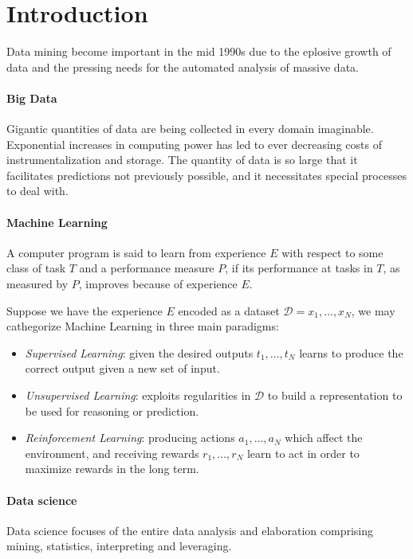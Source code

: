 \section{Introduction}

Data mining become important in the mid 1990s due to the eplosive growth of data and the pressing needs for the automated analysis of massive data. 

\paragraph*{Big Data}
Gigantic quantities of data are being collected in every domain imaginable. 
Exponential increases in computing power has led to ever decreasing costs of instrumentalization and storage. 
The quantity of data is so large that it facilitates predictions not previously possible, and it necessitates special processes to deal with. 

\paragraph*{Machine Learning}
\begin{definition}
    A computer program is said to learn from experience $E$ with respect to some class of task $T$ and a performance measure $P$, if its performance at tasks in $T$, as measured by $P$, improves because of experience $E$.
\end{definition}
\noindent Suppose we have the experience $E$ encoded as a dataset $\mathcal{D}=x_1,\dots,x_N$, we may cathegorize Machine Learning in three main paradigms: 
\begin{itemize}
    \item \textit{Supervised Learning}: given the desired outputs $t_1,\dots,t_N$ learns to produce the correct output given a new set of input. 
    \item \textit{Unsupervised Learning}: exploits regularities in $\mathcal{D}$ to build a representation to be used for reasoning or prediction. 
    \item \textit{Reinforcement Learning}: producing actions $a_1,\dots,a_N$ which affect the environment, and receiving rewards $r_1,\dots,r_N$ learn to act in order to maximize rewards in the long term.
\end{itemize}

\paragraph*{Data science}
Data science focuses of the entire data analysis and elaboration comprising mining, statistics, interpreting and leveraging. 
